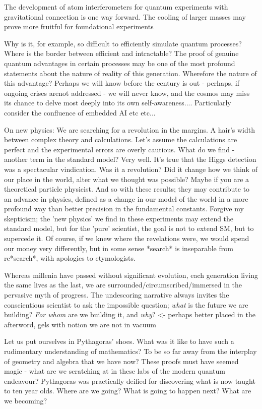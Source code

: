 	The development of atom interferometers for quantum experiments with gravitational connection is one way forward. The cooling of larger masses may prove more fruitful for foundational experiments

Why is it,
	for example, so difficult to efficiently simulate quantum processes?
	Where is the border between efficient and intractable? The proof of
	genuine quantum advantages in certain processes may be one of the most
	profound statements about the nature of reality of this generation.
	Wherefore the nature of this advantage? Perhaps we will know before the
	century is out - perhaps, if ongoing crises arenot addressed - we will
	never know, and the cosmos may miss its chance to delve most deeply into
	its own self-awareness.... Particularly consider the confluence of embedded AI etc etc...


			On new physics: We are searching for a revolution in the margins.
	A hair's width between complex theory and calculations.
	Let's assume the calculations are perfect and the experimental errors are overly cautious.
	What do we find - another term in the standard model? Very well.
	It's true that the Higgs detection was a spectacular vindication.
	Was it a revolution? Did it change how we think of our place in the world, alter what we thought was possible? Maybe if you are a theoretical particle physicist.
	And so with these results; they may contribute to an advance in physics, defined as a change in our model of the world in a more profound way than better precision in the fundamental constants.
	Forgive my skepticism; the 'new physics' we find in these experiments may extend the standard model, but for the 'pure' scientist, the goal is not to extend SM, but to supercede it.
	Of course, if we knew where the revelations were, we would spend our money very differently, but in some sense *search* is inseparable from re*search*, with apologies to etymologists.


Whereas millenia have passed without significant evolution, each generation living the same lives as the last, we are surrounded/circumscribed/immersed in the pervasive myth of progress.
	The undescoring narrative always invites the conscientious scientist to ask the impossible question; \emph{what} is the future we are building? \emph{For whom} are we building it, and \emph{why}? <- perhaps better placed in the afterword, gels with notion we are not in vacuum
	

Let us put ourselves in Pythagoras' shoes. What was it like to have such a rudimentary understanding of mathematics? To be so far away from the interplay of geometry and algebra that we have now? These proofs must have seemed magic - what are we scratching at in these labs of the modern quantum endeavour? Pythagoras was practically deified for discovering what is now taught to ten year olds. Where are we going? What is going to happen next? What are we becoming?

